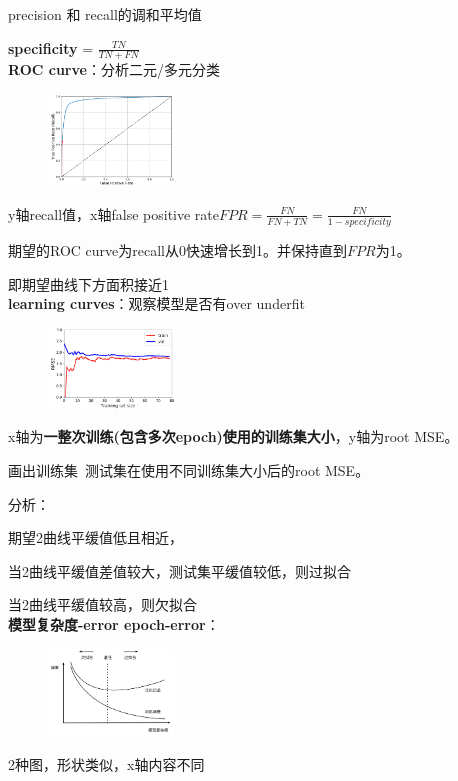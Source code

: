 \documentclass[UTF8]{ctexart}
\begin{document}
  \quad precision 和 recall的调和平均值
  
  \textbf{specificity} = $\frac{TN}{TN + FN}$\\
\textbf{ROC curve}：分析二元/多元分类

  \begin{figure}[H] %
    \centering %
    \includegraphics[width=0.3\textwidth]{note_images/ROC_curve.png} %
  \end{figure}

  y轴recall值，x轴false positive rate$FPR = \frac{FN}{FN + TN} = \frac{FN}{1-specificity}$

  期望的ROC curve为recall从0快速增长到1。并保持直到$FPR$为1。
  
  \quad 即期望曲线下方面积接近1\\
\textbf{learning curves}：观察模型是否有over underfit

  \begin{figure}[H] %
    \centering %
    \includegraphics[width=0.3\textwidth]{note_images/learning_curve.png} %
  \end{figure}

  x轴为\textbf{一整次训练(包含多次epoch)使用的训练集大小}，y轴为root MSE。

  画出训练集\ 测试集在使用不同训练集大小后的root MSE。

  分析：

  \quad 期望2曲线平缓值低且相近，

  \quad 当2曲线平缓值差值较大，测试集平缓值较低，则过拟合

  \quad 当2曲线平缓值较高，则欠拟合\\
\textbf{模型复杂度-error epoch-error}：

  \begin{figure}[H] %
    \centering %
    \includegraphics[width=0.3\textwidth]{note_images/epoch-complex-error.png} %
  \end{figure}

  2种图，形状类似，x轴内容不同\\
\end{document}
